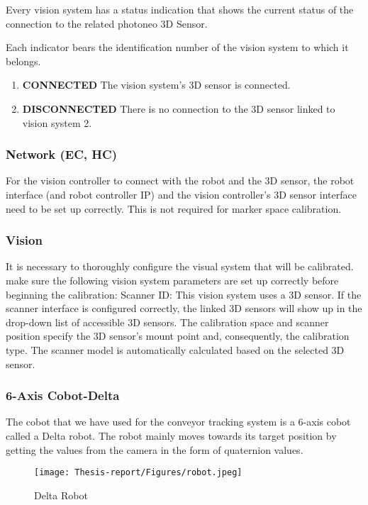 \documentclass[12pt]{article}
\begin{document}
 Every vision system has a status indication that shows the current status of the connection to the related photoneo 3D Sensor.

        Each indicator bears the identification number of the vision system to which it belongs.
  \begin{enumerate}
  \item  \textbf{CONNECTED} The vision system's 3D sensor is connected\cite{ref2}.
  \item   \textbf{DISCONNECTED}  There is no connection to the 3D sensor linked to vision system 2\cite{ref2}.
 \end{enumerate}

\subsubsection{Network (EC, HC)}
For the vision controller to connect with the robot and the 3D sensor, the robot interface (and robot controller IP) and the vision controller's 3D sensor interface need to be set up correctly. This is not required for marker space calibration\cite{ref2}.
\subsubsection{Vision }
It is necessary to thoroughly configure the visual system that will be calibrated. make sure the following vision system parameters are set up correctly before beginning the calibration:
 Scanner ID: This vision system uses a 3D sensor. If the scanner interface is configured correctly, the linked 3D sensors will show up in the drop-down list of accessible 3D sensors.
The calibration space and scanner position specify the 3D sensor's mount point and, consequently, the calibration type. The scanner model is automatically calculated based on the selected 3D sensor\cite{ref2}.



\subsubsection{6-Axis Cobot-Delta}
The cobot that we have used for the conveyor tracking system is a 6-axis cobot called a Delta robot. The robot mainly moves towards its target position by getting the values from the camera in the form of quaternion values\cite{ref2}.

\begin{figure}[H]
  \centering
  \texttt{[image: Thesis-report/Figures/robot.jpeg]}
  \caption{Delta Robot}
  \label{fig:delta_robot}
\end{figure}
\end{document}
